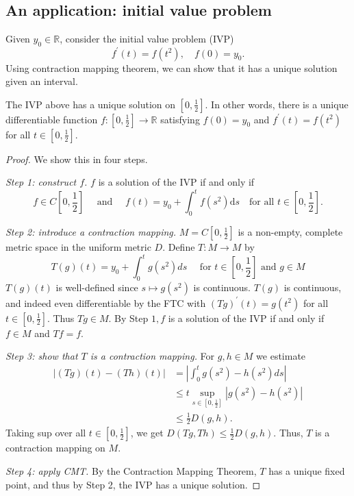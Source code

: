 \documentclass[a4paper]{article}
\begin{document}
\subsection{An application: initial value problem}
Given $y_0 \in \mathbb{R}$, consider the initial value problem (IVP)
\[
f^{\prime}(t)=f\left(t^2\right), \quad f(0)=y_0.
\]
Using contraction mapping theorem, we can show that it has a unique solution given an interval. 
\begin{proposition}
    The IVP above has a unique solution on $\left[0, \frac{1}{2}\right]$. In other words, there is a unique differentiable function $f:\left[0, \frac{1}{2}\right] \rightarrow \mathbb{R}$ satisfying $f(0)=y_0$ and $f^{\prime}(t)=f\left(t^2\right)$ for all $t \in\left[0, \frac{1}{2}\right]$.
\end{proposition}
\begin{proof}
    We show this in four steps. 

    \textit{Step 1: construct $f$.} $ f$ is a solution of the IVP if and only if
        \[
        f \in C\left[0, \frac{1}{2}\right] \quad \text { and } \quad f(t)=y_0+\int_0^t f\left(s^2\right) \mathrm{d} s \quad \text {for all } t \in\left[0, \frac{1}{2}\right].
        \]

    \textit{Step 2: introduce a contraction mapping.} $ M=C\left[0, \frac{1}{2}\right]$ is a non-empty, complete metric space in the uniform metric $D$. Define $T: M \rightarrow M$ by
    \[
    T(g)(t)=y_0+\int_0^t g\left(s^2\right) d s \quad \text { for } t \in\left[0, \frac{1}{2}\right] \text { and } g \in M
    \]
    $T(g)(t)$ is well-defined since $s \mapsto g\left(s^2\right)$ is continuous. $T(g)$ is continuous, and indeed even differentiable by the FTC with $(T g)^{\prime}(t)=g\left(t^2\right)$ for all $t \in\left[0, \frac{1}{2}\right]$.
    Thus $T g \in M$.
    By Step $1, f$ is a solution of the IVP if and only if $f \in M$ and $T f=f$.

    \textit{Step 3: show that $T$ is a contraction mapping.} For $g, h \in M$ we estimate
    \begin{align*}
        |(T g)(t)-(T h)(t)|&=\left|\int_0^t g\left(s^2\right)-h\left(s^2\right) d s\right| \\ 
        &\leqslant t \sup _{s \in\left[0, \frac{1}{2}\right]}\left|g\left(s^2\right)-h\left(s^2\right)\right| \\ 
        &\leqslant \frac{1}{2} D(g, h).
    \end{align*}
    Taking sup over all $t \in\left[0, \frac{1}{2}\right]$, we get $D(T g, T h) \leqslant \frac{1}{2} D(g, h)$. Thus, $T$ is a contraction mapping on $M$.

    \textit{Step 4: apply CMT.} By the Contraction Mapping Theorem, $T$ has a unique fixed point, and thus by Step 2, the IVP has a unique solution.
\end{proof}
\end{document}
